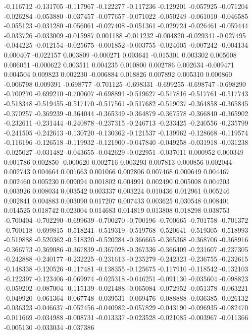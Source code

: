 -0.116712
-0.131705
-0.117967
-0.122277
-0.117236
-0.129201
-0.057925
-0.071204
-0.026284
-0.053880
-0.037457
-0.077657
-0.071022
-0.050249
-0.061010
-0.046585
-0.055123
-0.031280
-0.056061
-0.027408
-0.051361
-0.029724
-0.026461
-0.059444
-0.033726
-0.033009
-0.015987
0.001188
-0.011232
-0.004820
-0.029341
-0.027495
-0.044225
-0.012154
-0.025675
-0.001852
-0.003755
-0.024605
-0.007242
-0.004134
0.000407
-0.022157
0.003809
-0.000271
0.003641
-0.015301
0.003302
0.005608
0.006051
-0.000622
0.003511
0.004235
0.010800
0.002786
0.002634
-0.009471
0.004504
0.009823
0.002230
-0.006884
0.018826
0.007892
0.005310
0.000860
-0.006798
0.009391
-0.698777
-0.701125
-0.698331
-0.699255
-0.698747
-0.698290
-0.700270
-0.699210
-0.700607
-0.698891
-0.519627
-0.517816
-0.517761
-0.517743
-0.518348
-0.519455
-0.517170
-0.517561
-0.517682
-0.519037
-0.364858
-0.365845
-0.370257
-0.369239
-0.364044
-0.365349
-0.364879
-0.367578
-0.366840
-0.365902
-0.232611
-0.231444
-0.240878
-0.237315
-0.246713
-0.233425
-0.240556
-0.235799
-0.241505
-0.242613
-0.130720
-0.130362
-0.121537
-0.139962
-0.128668
-0.119574
-0.116196
-0.126518
-0.119932
-0.121900
-0.047840
-0.049258
-0.031918
-0.031238
-0.025027
-0.031482
-0.043655
-0.042629
-0.022951
-0.037011
0.000952
0.000349
0.001786
0.002850
-0.000620
0.002716
0.003293
0.007813
0.000856
0.002044
0.002743
0.004664
0.001663
0.001066
0.002806
0.007468
0.000649
0.004467
0.002460
0.005230
0.009094
0.001802
0.004991
0.002490
0.005008
0.004203
0.003926
0.008034
0.003542
0.003337
0.003224
0.010436
0.012961
0.005246
0.002841
0.004883
0.003090
0.017207
0.007433
0.003625
0.030548
0.008401
0.014525
0.018742
0.023004
0.014683
0.014819
0.013808
0.018298
0.038753
-0.700404
-0.702290
-0.699639
-0.700270
-0.700196
-0.700665
-0.701758
-0.701372
-0.700118
-0.699815
-0.518241
-0.519319
-0.519768
-0.520641
-0.519305
-0.518993
-0.519888
-0.520362
-0.518320
-0.520284
-0.366665
-0.365368
-0.368706
-0.368916
-0.366773
-0.369086
-0.367839
-0.367028
-0.367336
-0.366409
-0.231607
-0.237305
-0.242888
-0.240177
-0.232225
-0.231613
-0.235279
-0.242323
-0.236755
-0.232615
-0.148338
-0.120526
-0.117481
-0.138355
-0.125675
-0.117910
-0.118542
-0.132103
-0.122397
-0.123406
-0.069974
-0.025318
-0.046251
-0.091130
-0.035604
-0.098823
-0.059202
-0.087004
-0.115139
-0.021488
-0.065084
-0.072952
-0.051378
-0.063221
-0.049920
-0.061364
-0.067748
-0.039531
-0.069476
-0.088888
-0.036385
-0.026132
-0.036323
-0.046637
-0.052456
-0.040982
-0.057829
-0.043190
-0.096935
-0.082470
-0.011669
-0.034988
-0.008731
-0.013337
-0.023528
-0.021085
-0.003967
-0.011366
-0.005130
-0.033034
-0.037386
